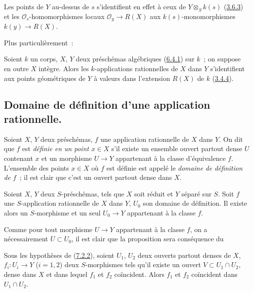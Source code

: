 Les points de $Y$ au-dessus de $s$ s'identifient en effet à ceux de
$Y\otimes_S k(s)$ (\hyperref[I.3.6.3-fr]{3.6.3}) et les
$\mathscr{O}_s$-homomorphismes locaux $\mathscr{O}_y\to R(X)$ aux
$k(s)$-monomorphismes $k(y)\to R(X)$.

Plus particulièrement~:

\begin{corollary}[7.1.16]
\label{I.7.1.16-fr}
Soient $k$ un corps, $X$, $Y$ deux préschémas algébriques
(\hyperref[I.6.4.1-fr]{6.4.1}) sur $k$~; on suppose en outre $X$ intègre. Alors
les $k$-applications rationnelles de $X$ dans $Y$ s'identifient aux points
géométriques de $Y$ à valeurs dans l'extension $R(X)$ de $k$
(\hyperref[I.3.4.4-fr]{3.4.4}).
\end{corollary}

\subsection{Domaine de définition d'une application rationnelle.}
\label{subsection:I.7.2-fr}

\begin{env}[7.2.1]
\label{I.7.2.1-fr}
Soient $X$, $Y$ deux préschémas, $f$ une application rationnelle de $X$ dans
$Y$. On dit que $f$ est \emph{définie en un point $x\in X$} s'il existe un
ensemble ouvert partout dense $U$ contenant $x$ et un morphisme $U\to Y$
appartenant à la classe d'équivalence $f$. L'ensemble des points $x\in X$ où
$f$ est définie est appelé le \emph{domaine de définition de $f$}~; il est
clair que c'est un ouvert partout dense dans $X$.
\end{env}

\begin{proposition}[7.2.2]
\label{I.7.2.2-fr}
Soient $X$, $Y$ deux $S$-préschémas, tels que $X$ soit réduit et $Y$ séparé
sur $S$. Soit $f$ une $S$-application rationnelle de $X$ dans $Y$, $U_0$ son
domaine de définition. Il existe alors un $S$-morphisme et un seul $U_0\to Y$
appartenant à la classe $f$.
\end{proposition}

Comme pour tout morphisme $U\to Y$ appartenant à la classe $f$, on a
nécessairement $U\subset U_0$, il est clair que la proposition sera
conséquence du

\begin{lemma}[7.2.2.1]
\label{I.7.2.2.1-fr}
Sous les hypothèses de (\hyperref[I.7.2.2-fr]{7.2.2}), soient $U_1$, $U_2$
deux ouverts partout denses de $X$, $f_i:U_i\to Y$ ($i=1,2$) deux
$S$-morphismes tels qu'il existe un ouvert $V\subset U_1\cap U_2$, dense dans
$X$ et dans lequel $f_1$ et $f_2$ coïncident. Alors $f_1$ et $f_2$ coïncident
dans $U_1\cap U_2$.
\end{lemma}

